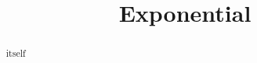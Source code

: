 \documentclass{ximera}
\title{Exponential}
\begin{document}
\begin{abstract}
itself
\end{abstract}
\maketitle
\end{document}
